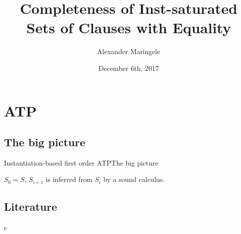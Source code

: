 \documentclass[%
handout,
]{beamer}
\title[Completeness of Inst-Saturation]{Completeness of Inst-saturated\\Sets of Clauses with Equality}
\author[{A$\ell$M}]{%
	Alexander Maringele
}
\institute[UIBK]{%
	{alexander.maringele@uibk.ac.at}
}
\date{December 6th, 2017}
\begin{document}
\titleframe





\section{ATP}
\subsection{The big picture}
\begin{frame}{Instantiation-based first order ATP}{The big picture}

    \vspace{0.7em}
    

    \vspace{0.7em}
    $S_0 = S$, $S_{i+1}$ is inferred from $S_i$ by a sound calculus.
\end{frame}


\subsection{Literature}
\begin{frame}
    \nocite{GK2004csl} %
    
    
\end{frame}


c

%             
%             


%     
%     




\end{document}
